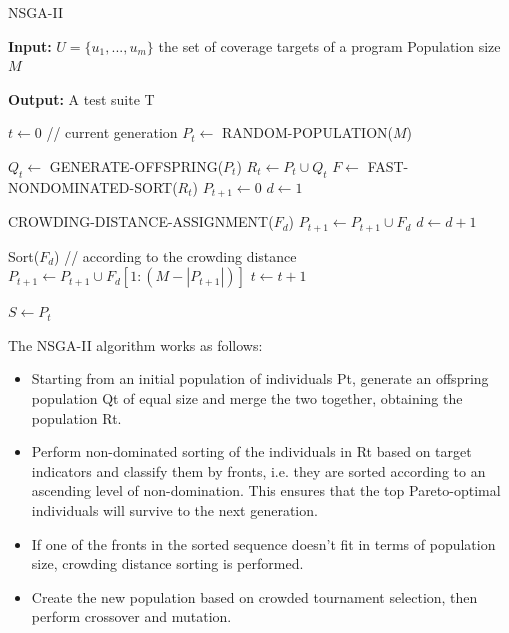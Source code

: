 \begin{algorithm}
    \caption{NSGA-II}
    \hspace*{\algorithmicindent} \textbf{Input:} 
    $ U = \{u_1,...,u_m\} $ the set of coverage targets of a program
    Population size $ M $

    \hspace*{\algorithmicindent} \textbf{Output:}
    A test suite T
    
    \begin{algorithmic}[1]
        \Begin
            \State $ t \leftarrow 0 $ // current generation
            \State $ P_t \leftarrow $ RANDOM-POPULATION($ M $) 

                \State $ Q_t \leftarrow $  GENERATE-OFFSPRING($ P_t $)
                \State $ R_t \leftarrow P_t \cup Q_t $
                \State $ F \leftarrow $  FAST-NONDOMINATED-SORT($ R_t $)
                \State $ P_{t + 1} \leftarrow 0 $
                \State $ d \leftarrow 1 $

                    CROWDING-DISTANCE-ASSIGNMENT($ F_d $)
                    \State $ P_{t + 1} \leftarrow P_{t + 1} \cup F_d $
                    \State $ d \leftarrow d + 1 $
                \EndWhile

                Sort($ F_d $) // according to the crowding distance
                \State $ P_{t + 1} \leftarrow P_{t + 1} \cup F_d[1: (M - |P_{t + 1}|)] $
                \State $ t \leftarrow t + 1 $
            \EndWhile

            \State $ S \leftarrow P_t $
        \End
    \end{algorithmic}
\end{algorithm}

The NSGA-II algorithm works as follows:
\begin{itemize}
    \item Starting from an initial population of individuals Pt, generate an offspring population Qt of equal size and merge the two together, obtaining the population Rt.
    \item Perform non-dominated sorting of the individuals in Rt based on target indicators and classify them by fronts, i.e. they are sorted according to an ascending level of non-domination.  This ensures that the top Pareto-optimal individuals will survive to the next generation.
    \item If one of the fronts in the sorted sequence doesn't fit in terms of population size, crowding distance sorting is performed.
    \item Create the new population based on crowded tournament selection, then perform crossover and mutation. 
\end{itemize}


